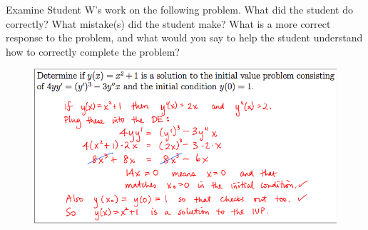 \documentclass[12pt,letterpaper]{hmcpset}
\begin{document}
\begin{problem}[4]
   Examine Student W's work on the following problem. What did the student do correctly? What mistake(s) did the student make? What is a more correct response to the problem, and what would you say to help the student understand how to correctly complete the problem? 
\end{problem}
   \begin{figure}[h]
   \centering 
   \includegraphics[width = 5in]{StudentW}
   \end{figure}
\begin{solution}
    \vfill
\end{solution}

\newpage
\end{document}
